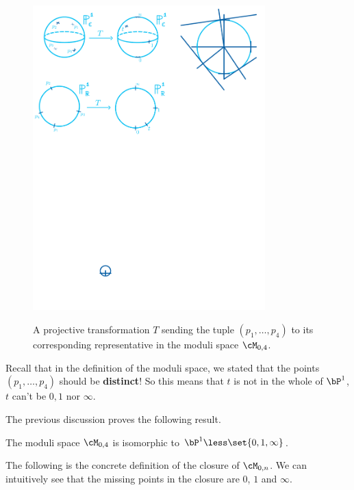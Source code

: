 \documentclass[12pt]{memoir}
\begin{document}
    \begin{figure}[h!]
        \centering
        \includegraphics[width=0.8\textwidth, trim= 0.17cm 16.37cm 9.325cm 7.075cm,clip]{fig4.pdf}%
        \label{fig5}
        \caption{A projective transformation $T$ sending the tuple $(p_1,\dots,p_4)$ to its corresponding representative in the moduli space $\cM_{0,4}$.}
    \end{figure}
    
    \begin{Rmk}
    Recall that in the definition of the moduli space, we stated that the points $(p_1,\dots,p_4)$ should be \textbf{distinct}! So this means that $t$ is not in the whole of $\bP^1$, $t$ can't be $0,1$ nor $\infty$. 
    \end{Rmk}
    
    The previous discussion proves the following result.
    
    \begin{Prop}
        The moduli space $\cM_{0,4}$ is isomorphic to $\bP^1\less\set{0,1,\infty}$.
    \end{Prop}
    
    The following is the concrete definition of the closure of $\cM_{0,n}$. We can intuitively see that the missing points in the closure are $0$, $1$ and $\infty$.
    
\end{document}
